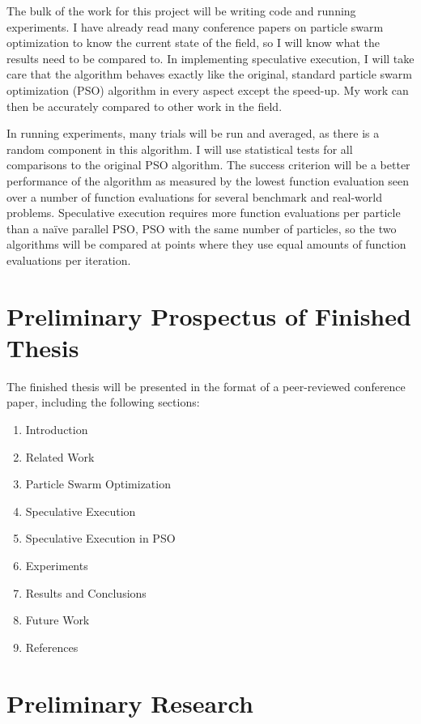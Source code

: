 \documentclass[onecolumn, 12pt]{article}
\begin{document}
The bulk of the work for this project will be writing code and running
experiments.  I have already read many conference papers on particle swarm
optimization to know the current state of the field, so I will know what the
results need to be compared to.  In implementing speculative execution, I will
take care that the algorithm behaves exactly like the original, standard
particle swarm optimization (PSO) algorithm in every aspect except the
speed-up.  My work can then be accurately compared to other work in the field.

In running experiments, many trials will be run and averaged, as there is a
random component in this algorithm.  I will use statistical tests for all
comparisons to the original PSO algorithm.  The success criterion will be a
better performance of the algorithm as measured by the lowest function
evaluation seen over a number of function evaluations for several benchmark and
real-world problems.  Speculative execution requires more function evaluations 
per particle than a na\"ive parallel PSO, %
PSO with the same number of particles, so the two algorithms will be compared
at points where they use equal amounts of function evaluations per iteration.

\section{Preliminary Prospectus of Finished Thesis}

The finished thesis will be presented in the format of a peer-reviewed
conference paper, including the following sections:

\begin{enumerate}
\item Introduction
\item Related Work
\item Particle Swarm Optimization
\item Speculative Execution
\item Speculative Execution in PSO
\item Experiments
\item Results and Conclusions
\item Future Work
\item References
\end{enumerate}

\section{Preliminary Research}
\end{document}

